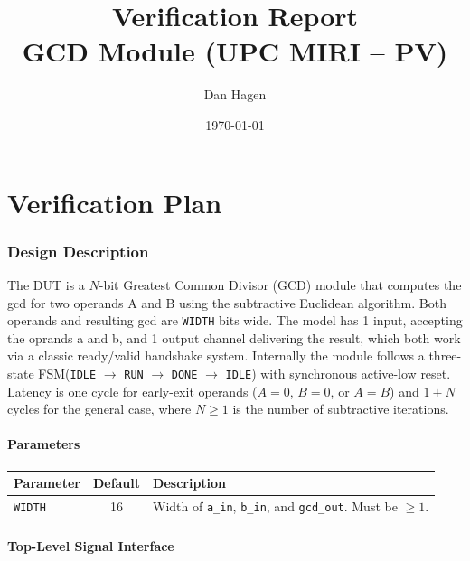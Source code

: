 \documentclass[11pt,a4paper]{article}
\title{Verification Report \\ \large GCD Module (UPC MIRI -- PV)}
\author{Dan Hagen}
\date{\today}
\begin{document}
\maketitle
\tableofcontents
\newpage

\part{Verification Plan}

\section{Design Description}

The DUT is a $N$-bit Greatest Common Divisor (GCD) module that computes the gcd for two operands A and B using the  subtractive Euclidean algorithm. Both operands and resulting gcd are \texttt{WIDTH} bits wide. The model has 1 input, accepting the oprands a and b, and 1 output channel delivering the result, which both work via a classic ready/valid handshake system. Internally the module follows a three-state FSM(\texttt{IDLE} $\rightarrow$ \texttt{RUN} $\rightarrow$ \texttt{DONE} $\rightarrow$ \texttt{IDLE}) with synchronous active-low reset. Latency is one cycle for early-exit operands ($A=0$, $B=0$, or $A=B$) and $1+N$ cycles for the general case, where $N \geq 1$ is the number of subtractive iterations.


\subsection*{Parameters}

\begin{table}[H]
\centering
\begin{tabular}{lcp{8cm}}
\toprule
Parameter & Default & Description \\
\midrule
\texttt{WIDTH} & 16 & Width of \texttt{a\_in}, \texttt{b\_in}, and \texttt{gcd\_out}. Must be $\geq 1$. \\
\bottomrule
\end{tabular}
\end{table}

\subsection*{Top-Level Signal Interface}
\end{document}

